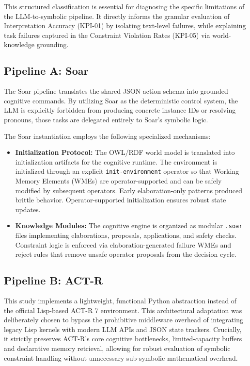 \documentclass[a4paper]{article}
\begin{document}
This structured classification is essential for diagnosing the specific limitations of the LLM-to-symbolic pipeline. It directly informs the granular evaluation of Interpretation Accuracy (KPI-01) by isolating text-level failures, while explaining task failures captured in the Constraint Violation Rates (KPI-05) via world-knowledge grounding.

\subsection{Pipeline A: Soar}

The Soar pipeline translates the shared JSON action schema into grounded cognitive commands. By utilizing Soar as the deterministic control system, the LLM is explicitly forbidden from producing concrete instance IDs or resolving pronouns, those tasks are delegated entirely to Soar's symbolic logic.

The Soar instantiation employs the following specialized mechanisms:
\begin{itemize}
    \item \textbf{Initialization Protocol:} The OWL/RDF world model is translated into initialization artifacts for the cognitive runtime. The environment is initialized through an explicit \texttt{init-environment} operator so that Working Memory Elements (WMEs) are operator-supported and can be safely modified by subsequent operators. Early elaboration-only patterns produced brittle behavior. Operator-supported initialization ensures robust state updates.
    \item \textbf{Knowledge Modules:} The cognitive engine is organized as modular \texttt{.soar} files implementing elaborations, proposals, applications, and safety checks. Constraint logic is enforced via elaboration-generated failure WMEs and reject rules that remove unsafe operator proposals from the decision cycle.
\end{itemize}

\subsection{Pipeline B: ACT-R}
\label{sec:actr}
This study implements a lightweight, functional Python abstraction instead of the official Lisp-based ACT-R 7 environment. This architectural adaptation was deliberately chosen to bypass the prohibitive middleware overhead of integrating legacy Lisp kernels with modern LLM APIs and JSON state trackers. Crucially, it strictly preserves ACT-R's core cognitive bottlenecks, limited-capacity buffers and declarative memory retrieval, allowing for robust evaluation of symbolic constraint handling without unnecessary sub-symbolic mathematical overhead.
\end{document}
